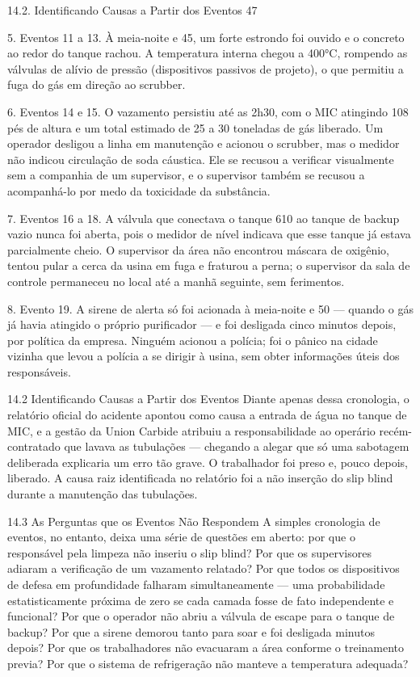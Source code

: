 14.2. Identificando Causas a Partir dos Eventos 47

5. Eventos 11 a 13. À meia-noite e 45, um forte estrondo foi ouvido e o concreto ao redor do tanque rachou. A temperatura interna chegou a 400°C, rompendo as válvulas de alívio de pressão (dispositivos passivos de projeto), o que permitiu a fuga do gás em direção ao scrubber.

6. Eventos 14 e 15. O vazamento persistiu até as 2h30, com o MIC atingindo 108 pés de altura e um total estimado de 25 a 30 toneladas de gás liberado. Um operador desligou a linha em manutenção e acionou o scrubber, mas o medidor não indicou circulação de soda cáustica. Ele se recusou a verificar visualmente sem a companhia de um supervisor, e o supervisor também se recusou a acompanhá-lo por medo da toxicidade da substância.

7. Eventos 16 a 18. A válvula que conectava o tanque 610 ao tanque de backup vazio nunca foi aberta, pois o medidor de nível indicava que esse tanque já estava parcialmente cheio. O supervisor da área não encontrou máscara de oxigênio, tentou pular a cerca da usina em fuga e fraturou a perna; o supervisor da sala de controle permaneceu no local até a manhã seguinte, sem ferimentos.

8. Evento 19. A sirene de alerta só foi acionada à meia-noite e 50 — quando o gás já havia atingido o próprio purificador — e foi desligada cinco minutos depois, por política da empresa. Ninguém acionou a polícia; foi o pânico na cidade vizinha que levou a polícia a se dirigir à usina, sem obter informações úteis dos responsáveis.

14.2 Identificando Causas a Partir dos Eventos Diante apenas dessa cronologia, o relatório oficial do acidente apontou como causa a entrada de água no tanque de MIC, e a gestão da Union Carbide atribuiu a responsabilidade ao operário recém-contratado que lavava as tubulações — chegando a alegar que só uma sabotagem deliberada explicaria um erro tão grave. O trabalhador foi preso e, pouco depois, liberado. A causa raiz identificada no relatório foi a não inserção do slip blind durante a manutenção das tubulações.

14.3 As Perguntas que os Eventos Não Respondem A simples cronologia de eventos, no entanto, deixa uma série de questões em aberto: por que o responsável pela limpeza não inseriu o slip blind? Por que os supervisores adiaram a verificação de um vazamento relatado? Por que todos os dispositivos de defesa em profundidade falharam simultaneamente — uma probabilidade estatisticamente próxima de zero se cada camada fosse de fato independente e funcional? Por que o operador não abriu a válvula de escape para o tanque de backup? Por que a sirene demorou tanto para soar e foi desligada minutos depois? Por que os trabalhadores não evacuaram a área conforme o treinamento previa? Por que o sistema de refrigeração não manteve a temperatura adequada?

